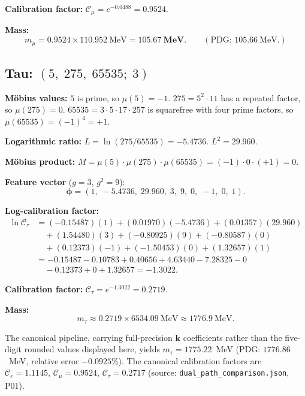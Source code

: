 \documentclass[11pt,a4paper]{article}
\begin{document}
\textbf{Calibration factor:} $\mathcal{C}_\mu = e^{-0.0488} = \mathbf{0.9524}$.

\textbf{Mass:}
\[
  m_\mu = 0.9524 \times 110.952~\text{MeV} = \mathbf{105.67~\text{MeV}}.
  \qquad (\text{PDG: } 105.66~\text{MeV}.)
\]

\subsection{Tau: $(5,\;275,\;65535;\;3)$}

\textbf{M\"{o}bius values:}
$5$ is prime, so $\mu(5) = -1$.
$275 = 5^2\cdot11$ has a repeated factor, so $\mu(275) = 0$.
$65535 = 3\cdot5\cdot17\cdot257$ is squarefree with four prime factors,
so $\mu(65535) = (-1)^4 = +1$.

\textbf{Logarithmic ratio:}
$L = \ln(275/65535) = -5.4736$.  $L^2 = 29.960$.

\textbf{M\"{o}bius product:}
$M = \mu(5)\cdot\mu(275)\cdot\mu(65535) = (-1)\cdot0\cdot(+1) = 0$.

\textbf{Feature vector} ($g=3$, $g^2=9$):
\[
  \boldsymbol{\phi} = (1,\; -5.4736,\; 29.960,\; 3,\; 9,\; 0,\; -1,\; 0,\; 1).
\]

\textbf{Log-calibration factor:}
\begin{align*}
  \ln \mathcal{C}_\tau &= (-0.15487)(1) + (0.01970)(-5.4736) + (0.01357)(29.960) \\
    &\quad + (1.54480)(3) + (-0.80925)(9) + (-0.80587)(0) \\
    &\quad + (0.12373)(-1) + (-1.50453)(0) + (1.32657)(1) \\
    &= -0.15487 - 0.10783 + 0.40656 + 4.63440 - 7.28325 - 0 \\
    &\quad - 0.12373 + 0 + 1.32657 = \mathbf{-1.3022}.
\end{align*}

\textbf{Calibration factor:} $\mathcal{C}_\tau = e^{-1.3022} = \mathbf{0.2719}$.

\textbf{Mass:}
\[
  m_\tau \approx 0.2719 \times 6534.09~\text{MeV} \approx 1776.9~\text{MeV}.
\]
{\sloppy
The canonical pipeline, carrying full-precision $\mathbf{k}$ coefficients rather than
the five-digit rounded values displayed here, yields $m_\tau = \mathbf{1775.22}$~MeV
(PDG: $1776.86$~MeV, relative error $-0.0925\%$).  The canonical
calibration factors are $\mathcal{C}_e = 1.1145$, $\mathcal{C}_\mu = 0.9524$,
$\mathcal{C}_\tau = 0.2717$ (source: \texttt{dual\_path\_comparison.json}, P01).
\par}
\end{document}
